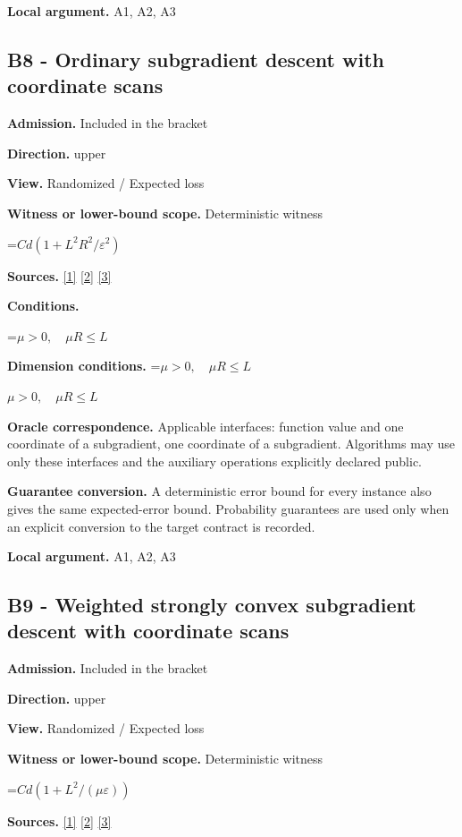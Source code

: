 \documentclass[10pt,a4paper]{article}
\newcommand{\AtlasMath}[1]{\par\begingroup\centering\setbox0=\hbox{$\displaystyle #1$}\ifdim\wd0>1.4\linewidth\typeout{ATLAS WIDE FORMULA: \the\wd0}\fi\ifdim\wd0>\linewidth\resizebox{\linewidth}{!}{\box0}\else\box0\fi\par\endgroup}
\newcommand{\AtlasInlineMath}[1]{\begingroup\setbox0=\hbox{$#1$}\ifdim\wd0>.4\linewidth\endgroup\AtlasMath{#1}\else\endgroup$#1$\fi}
\begin{document}
\textbf{Local argument.} A1, A2, A3

\subsection{B8 - Ordinary subgradient descent with coordinate scans}
\textbf{Admission.} Included in the bracket

\textbf{Direction.} upper

\textbf{View.} Randomized / Expected loss

\textbf{Witness or lower-bound scope.} Deterministic witness

\AtlasMath{Cd(1+L^2R^2/\varepsilon^2)}
\textbf{Sources.} \href{https://arxiv.org/pdf/1405.4980}{[1]} \href{https://www2.isye.gatech.edu/~nemirovs/MOR_AccuracyCertificates.pdf}{[2]} \href{https://arxiv.org/pdf/2609.20701}{[3]}

\textbf{Conditions.} 
\AtlasMath{\mu>0,\quad\mu R\le L}


\textbf{Dimension conditions.} \AtlasInlineMath{\mu>0,\quad\mu R\le L}

\textbf{Oracle correspondence.} Applicable interfaces: function value and one coordinate of a subgradient, one coordinate of a subgradient. Algorithms may use only these interfaces and the auxiliary operations explicitly declared public.

\textbf{Guarantee conversion.} A deterministic error bound for every instance also gives the same expected-error bound. Probability guarantees are used only when an explicit conversion to the target contract is recorded.

\textbf{Local argument.} A1, A2, A3

\subsection{B9 - Weighted strongly convex subgradient descent with coordinate scans}
\textbf{Admission.} Included in the bracket

\textbf{Direction.} upper

\textbf{View.} Randomized / Expected loss

\textbf{Witness or lower-bound scope.} Deterministic witness

\AtlasMath{Cd(1+L^2/(\mu\varepsilon))}
\textbf{Sources.} \href{https://arxiv.org/pdf/1405.4980}{[1]} \href{https://www2.isye.gatech.edu/~nemirovs/MOR_AccuracyCertificates.pdf}{[2]} \href{https://arxiv.org/pdf/2609.20701}{[3]}
\end{document}
